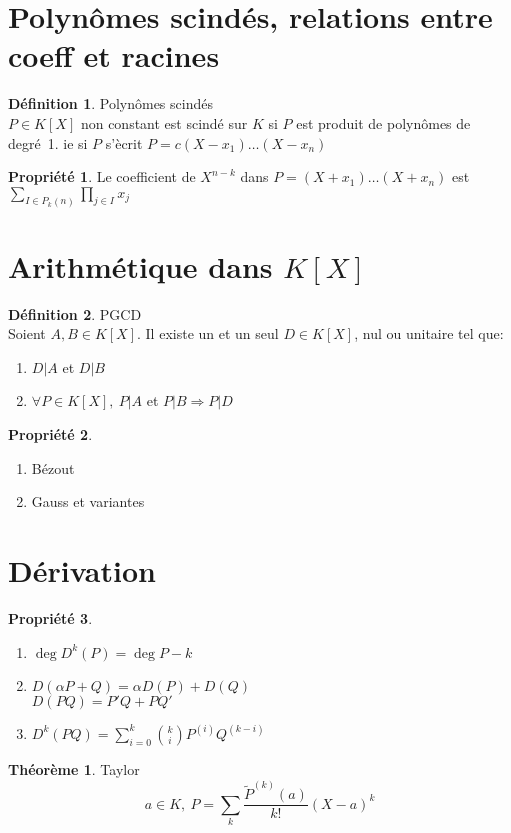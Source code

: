 \documentclass[fleqn]{article}
\theoremstyle{definition} \newtheorem*{defi}{D\'efinition}
\theoremstyle{definition} \newtheorem*{theo}{Th\'eor\`eme}
\theoremstyle{definition} \newtheorem*{coro}{Corollaire}
\theoremstyle{definition} \newtheorem*{nota}{Notation}
\theoremstyle{remark} \newtheorem*{rqs}{Remarques}
\theoremstyle{definition} \newtheorem*{prop}{Propri\'et\'e}
\begin{document}
\section{Polyn\^omes scind\'es, relations entre coeff et racines}
\begin{defi} Polyn\^omes scind\'es \\
	$P \in K[X]$ non constant est scind\'e sur $K$ si $P$ est produit de polyn\^omes de \mbox{degr\'e 1.}
	ie si $P$ s'\`ecrit $P = c(X-x_1)\hdots(X-x_n)$
\end{defi}

\begin{prop}
	Le coefficient de $X^{n-k}$ dans $P = (X+x_1) \hdots (X + x_n)$ est $\sum_{I \in P_k(n)} \prod_{j \in I} x_j$
\end{prop}

\section{Arithm\'etique dans $K[X]$}
\begin{defi} PGCD\\
	Soient $A,B \in K[X]$. Il existe un et un seul $D \in K[X]$, nul ou unitaire tel que:
	\begin{enumerate}
		\item $D | A$ et $D | B$
		\item $\forall P \in K[X],\ P|A$ et $P|B \Rightarrow P|D$
	\end{enumerate}
\end{defi}

\begin{prop} $ $
	\begin{enumerate}
		\item B\'ezout
		\item Gauss et variantes
	\end{enumerate}
\end{prop}

\section{D\'erivation}
\begin{prop} $ $
	\begin{enumerate}
		\item $\deg D^k(P) = \deg P - k$
		\item $D(\alpha P + Q) = \alpha D(P) + D(Q)$ \\
			$D(PQ) = P'Q + PQ'$
		\item $D^k(PQ) = \sum_{i = 0}^k \binom{k}{i}P^{(i)}Q^{(k-i)}$
	\end{enumerate}
\end{prop}
\begin{theo} Taylor
	\[a \in K,\ P = \sum_k \frac{\tilde{P}^{(k)}(a)}{k!} (X - a)^k\]
\end{theo}
\end{document}
